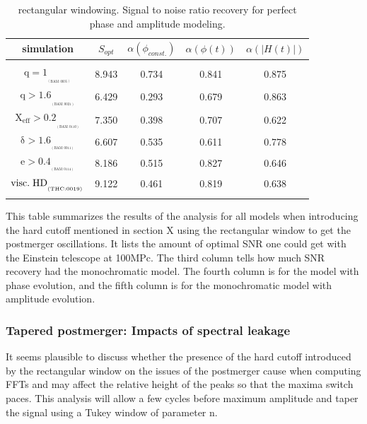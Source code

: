 \begin{table}[!htbp]
\begin{center}

\begin{tabular}{ccccc}

simulation&$S_{opt}$&$\alpha(\phi_{const.})$&$\alpha(\phi(t))$&$\alpha(|H(t)|)$\\ 
\hline\\ 
$\mathrm{{q=1}_{_{_{(BAM:0035)}}}}$&8.943&0.734&0.841&0.875\\  
$\mathrm{{q>1.6}_{_{_{(BAM:0021)}}}}$&6.429&0.293&0.679&0.863\\  
$\mathrm{{X_{eff}>0.2}_{_{_{(BAM:0110)}}}}$&7.350&0.398&0.707&0.622\\  
$\mathrm{{\delta>1.6}_{_{_{(BAM:0011)}}}}$&6.607&0.535&0.611&0.778\\  
$\mathrm{{e>0.4}_{_{_{(BAM:0114)}}}}$&8.186&0.515&0.827&0.646\\  
$\mathrm{{visc.\hspace{1mm} HD}_{_{_{(THC:0019)}}}}$&9.122&0.461&0.819&0.638\\  
\hline\\ 

\end{tabular}
\end{center}
\caption{rectangular windowing. Signal to noise ratio recovery for perfect phase and amplitude modeling.}
This table summarizes the results of the analysis for all models when introducing the hard cutoff mentioned in section X using the rectangular window to get the postmerger oscillations. It lists the amount of optimal SNR one could get with the Einstein telescope at 100MPc. The third column tells how much SNR recovery had the monochromatic model. The fourth column is for the model with phase evolution, and the fifth column is for the monochromatic model with amplitude evolution.
\label{table untapered}
\end{table}
\FloatBarrier

\subsubsection*{Tapered postmerger: Impacts of spectral leakage}

It seems plausible to discuss whether the presence of the hard cutoff introduced by the rectangular window on the issues of the postmerger cause when computing FFTs and may affect the relative height of the peaks so that the maxima switch paces. This analysis will allow a few cycles before maximum amplitude and taper the signal using a Tukey window of parameter n.

